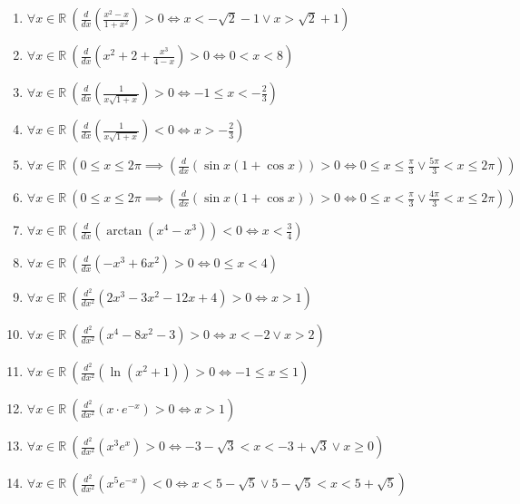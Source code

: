 \documentclass[11pt,a4paper]{article}
\begin{document}
\begin{enumerate}
\item $\displaystyle \forall x \in \mathbb{R}\ \left(\frac{d}{dx}\left( \frac{x^{2} - x}{1 + x^{2}} \right) > 0 \iff x < -\sqrt{2} - 1 \lor x > \sqrt{2} + 1\right)$
\item $\displaystyle \forall x \in \mathbb{R}\ \left(\frac{d}{dx}\left( x^{2} + 2 + \frac{x^{3}}{4 - x} \right) > 0 \iff 0 < x < 8\right)$
\item $\displaystyle \forall x \in \mathbb{R}\ \left(\frac{d}{dx}\left( \frac{1}{x\sqrt{1 + x}} \right) > 0 \iff -1 \le x < -\frac{2}{3}\right)$
\item $\displaystyle \forall x \in \mathbb{R}\ \left(\frac{d}{dx}\left( \frac{1}{x\sqrt{1 + x}} \right) < 0 \iff x > -\frac{2}{3}\right)$
\item $\displaystyle \forall x \in \mathbb{R}\ \left(0 \le x \le 2\pi \implies \left(\frac{d}{dx}\left( \sin x(1 + \cos x) \right) > 0 \iff 0 \le x \le \frac{\pi}{3} \lor \frac{5\pi}{3} < x \le 2\pi\right)\right)$
\item $\displaystyle \forall x \in \mathbb{R}\ \left(0 \le x \le 2\pi \implies \left(\frac{d}{dx}\left( \sin x(1 + \cos x) \right) > 0 \iff 0 \le x < \frac{\pi}{3} \lor \frac{4\pi}{3} < x \le 2\pi\right)\right)$
\item $\displaystyle \forall x \in \mathbb{R}\ \left(\frac{d}{dx}\left( \arctan(x^{4} - x^{3}) \right) < 0 \iff x < \frac{3}{4}\right)$
\item $\displaystyle \forall x \in \mathbb{R}\ \left(\frac{d}{dx}\left( -x^{3} + 6x^{2} \right) > 0 \iff 0 \le x < 4\right)$
\item $\displaystyle \forall x \in \mathbb{R}\ \left(\frac{d^{2}}{dx^{2}}\left( 2x^{3} - 3x^{2} - 12x + 4 \right) > 0 \iff x > 1\right)$
\item $\displaystyle \forall x \in \mathbb{R}\ \left(\frac{d^{2}}{dx^{2}}\left( x^{4} - 8x^{2} - 3 \right) > 0 \iff x < -2 \lor x > 2\right)$
\item $\displaystyle \forall x \in \mathbb{R}\ \left(\frac{d^{2}}{dx^{2}}\left( \ln(x^{2} + 1) \right) > 0 \iff -1 \le x \le 1\right)$
\item $\displaystyle \forall x \in \mathbb{R}\ \left(\frac{d^{2}}{dx^{2}}\left( x \cdot e^{-x} \right) > 0 \iff x > 1\right)$
\item $\displaystyle \forall x \in \mathbb{R}\ \left(\frac{d^{2}}{dx^{2}}\left( x^{3}e^{x} \right) > 0 \iff -3 - \sqrt{3} < x < -3 + \sqrt{3} \lor x \ge 0\right)$
\item $\displaystyle \forall x \in \mathbb{R}\ \left(\frac{d^{2}}{dx^{2}}\left( x^{5}e^{-x} \right) < 0 \iff x < 5 - \sqrt{5} \lor 5 - \sqrt{5} < x < 5 + \sqrt{5}\right)$

\end{enumerate}
\end{document}

